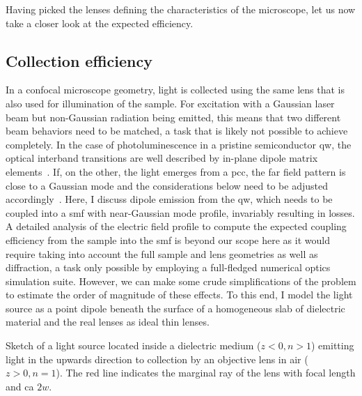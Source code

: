 Having picked the lenses defining the characteristics of the microscope, let us now take a closer look at the expected efficiency.

\subsection{Collection efficiency}\label{subsec:setup:optics:coupling:efficiency}
In a confocal microscope geometry, light is collected using the same lens that is also used for illumination of the sample.
For excitation with a Gaussian laser beam but non-Gaussian radiation being emitted, this means that two different beam behaviors need to be matched, a task that is likely not possible to achieve completely.
In the case of photoluminescence in a pristine semiconductor \gls{qw}, the optical interband transitions are well described by in-plane dipole matrix elements~\cite{Gu2013}.
If, on the other, the light emerges from a \gls{pcc}, the far field pattern is close to a Gaussian mode and the considerations below need to be adjusted accordingly~\cite{Wu2024a}.
Here, I discuss dipole emission from the \gls{qw}, which needs to be coupled into a \gls{smf} with near-Gaussian mode profile, invariably resulting in losses.
A detailed analysis of the electric field profile to compute the expected coupling efficiency from the sample into the \gls{smf} is beyond our scope here as it would require taking into account the full sample and lens geometries as well as diffraction, a task only possible by employing a full-fledged numerical optics simulation suite.
However, we can make some crude simplifications of the problem to estimate the order of magnitude of these effects.
To this end, I model the light source as a point dipole beneath the surface of a homogeneous slab of dielectric material and the real lenses as ideal thin lenses.

\begin{marginfigure}
    
    \caption[]{
        Sketch of a light source located inside a dielectric medium ($z < 0, n > 1$) emitting light in the upwards direction to collection by an objective lens in air ($z > 0, n = 1$).
        The red line indicates the marginal ray of the lens with focal length \fob and \gls{ca} $2w$.
    }
    \label{fig:setup:optics:coupling:emission}
\end{marginfigure}

